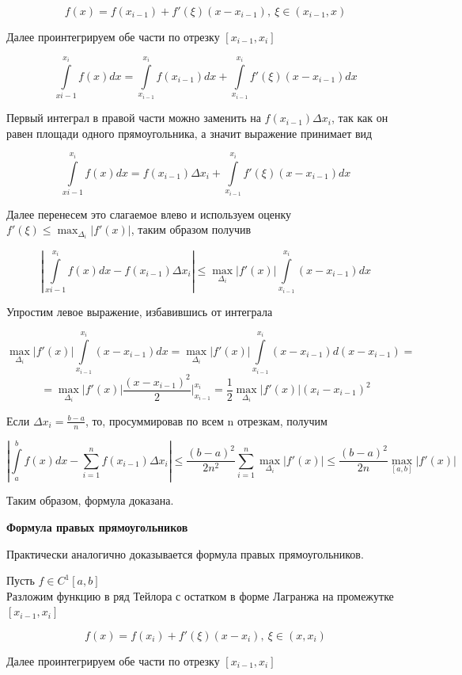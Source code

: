 \documentclass[12pt, a4paper]{report}
\begin{document}
	\[ f(x) = f(x_{i-1}) + f'(\xi)(x - x_{i-1}), \ \xi \in (x_{i-1}, x)\]
	
	Далее проинтегрируем обе части по отрезку $[x_{i-1}, x_i]$
	
	\[ \int\limits_{x{i-1}}^{x_i} f(x)dx = \int\limits_{x_{i-1}}^{x_i} f(x_{i-1})dx + \int\limits_{x_{i-1}}^{x_i} f'(\xi)(x - x_{i-1})dx\]
	
	Первый интеграл в правой части можно заменить на $f(x_{i-1}) \Delta x_i$, так как он равен площади одного прямоугольника, а значит выражение принимает вид 
	
	\[ \int\limits_{x{i-1}}^{x_i} f(x)dx = f(x_{i-1}) \Delta x_i + \int\limits_{x_{i-1}}^{x_i} f'(\xi)(x - x_{i-1})dx\]
	
	Далее перенесем это слагаемое влево и используем оценку $f'(\xi) \leq \max_{\Delta_i} |f'(x)|$, таким образом получив
	
	\[ \left| \int\limits_{x{i-1}}^{x_i} f(x)dx - f(x_{i-1}) \Delta x_i \right| \leq \max_{\Delta_i} |f'(x)| \int\limits_{x_{i-1}}^{x_i} (x - x_{i-1})dx\]
	
	Упростим левое выражение, избавившись от интеграла
	
	\[ \max_{\Delta_i} |f'(x)| \int\limits_{x_{i-1}}^{x_i} (x - x_{i-1})dx = \max_{\Delta_i} |f'(x)| \int\limits_{x_{i-1}}^{x_i} (x - x_{i-1})d(x - x_{i-1}) = \]
	\[ = \max_{\Delta_i} |f'(x)| \frac{(x-x_{i-1})^2}{2} \Bigg|_{x_{i-1}}^{x_i} = \frac{1}{2} \max_{\Delta_i} |f'(x)| (x_i - x_{i-1})^2 \]
	
	Если $ \Delta x_i = \frac{b-a}{n}$, то, просуммировав по всем n отрезкам, получим
	
	\[ \left| \int\limits_{a}^{b} f(x)dx - \sum_{i=1}^{n} f(x_{i-1}) \Delta x_i \right| \leq \frac{(b-a)^2}{2n^2} \sum_{i=1}^{n} \max_{\Delta_i}|f'(x)| \leq \frac{(b-a)^2}{2n} \max_{[a, b]}|f'(x)|\]
	
	Таким образом, формула доказана.
	
	\newpage
	
	\textbf{Формула правых прямоугольников}
	
	Практически аналогично доказывается формула правых прямоугольников.
	
	Пусть $f \in C^1[a,b]$ \\ 
	Разложим функцию в ряд Тейлора с остатком в форме Лагранжа на промежутке $[x_{i-1}, x_i]$
	
	\[ f(x) = f(x_i) + f'(\xi)(x - x_i), \ \xi \in (x, x_i)\]
	
	Далее проинтегрируем обе части по отрезку $[x_{i-1}, x_i]$
	
\end{document}
